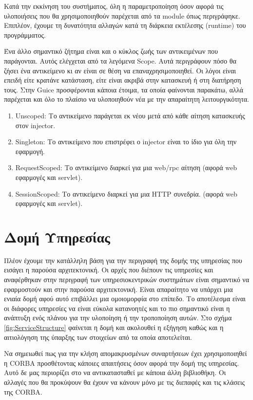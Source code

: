 Κατά την εκκίνηση του συστήματος, όλη η παραμετροποίηση όσον αφορά 
τις υλοποιήσεις που θα χρησιμοποιηθούν παρέχεται από τα module όπως 
περιγράφηκε. Επιπλέον, έχουμε τη δυνατότητα αλλαγών κατά τη διάρκεια 
εκτέλεσης (runtime) του προγράμματος.

Ένα άλλο σημαντικό ζήτημα είναι και ο κύκλος ζωής των αντικειμένων που 
παράγονται. Αυτός ελέγχεται από τα λεγόμενα Scope. Αυτά περιγράφουν πόσο 
θα ζήσει ένα αντικείμενο κι αν είναι σε θέση να επαναχρησιμοποιηθεί. Οι 
λόγοι είναι επειδή είτε κρατάνε κατάσταση, είτε είναι ακριβά στην 
κατασκευή ή στη διατήρηση τους. Στην Guice προσφέρονται κάποια έτοιμα, 
τα οποία φαίνονται παρακάτω, αλλά παρέχεται και όλο το πλαίσιο να 
υλοποιηθούν νέα με την απαραίτητη λειτουργικότητα.

\begin{enumerate}
\item Unscoped: Το αντικείμενο παράγεται εκ νέου μετά από κάθε αίτηση 
κατασκευής στον injector.
\item Singleton: Το αντικείμενο που επιστρέφει ο injector είναι το ίδιο 
για όλη την εφαρμογή.
\item RequestScoped: Το αντικείμενο διαρκεί για μια web/rpc αίτηση 
(αφορά web εφαρμογές και servlet).
\item SessionScoped: Το αντικείμενο διαρκεί για μια HTTP συνεδρία. 
(αφορά web εφαρμογές και servlet).
\setcounter{numberedCntE}{\theenumi}
\end{enumerate}

\section{Δομή Υπηρεσίας}

Πλέον έχουμε την κατάλληλη βάση για την περιγραφή της δομής της 
υπηρεσίας που εισάγει η παρούσα αρχιτεκτονική. Οι αρχές που διέπουν τις 
υπηρεσίες και αναφέρθηκαν στην περιγραφή των υπηρεσιοκεντρικών 
συστημάτων είναι σημαντικό να εφαρμοστούν και στην παρούσα 
αρχιτεκτονική. Είναι απαραίτητο να υπάρχει μια ενιαία δομή αφού αυτό 
επιβάλλει μια ομοιομορφία στο επίπεδο. Το αποτέλεσμα είναι οι διάφορες 
υπηρεσίες να είναι εύκολα κατανοητές και το πιο σημαντικό είναι η 
ανάπτυξη ενός πλάνου για την υλοποίηση ή την τροποποίηση αυτών. Στο σχήμα 
\ref{fig:ServiceStructure} φαίνεται η δομή και ακολουθεί η εξήγηση καθώς και η 
αιτιολόγηση της ύπαρξης των στοιχείων από τα οποία αποτελείται. 

Να σημειωθεί πως για την κλήση απομακρυσμένων συναρτήσεων έχει 
χρησιμοποιηθεί η CORBA προσθέτοντας κάποιες απαιτήσεις όσον αφορά 
την δομή της υπηρεσίας. Αυτό δε μας περιορίζει στο να αντικατασταθεί με 
κάποια άλλη βιβλιοθήκη. Οι αλλαγές που θα προκύψουν θα έχουν να κάνουν 
μόνο με τις διεπαφές και τις κλάσεις της CORBA.

